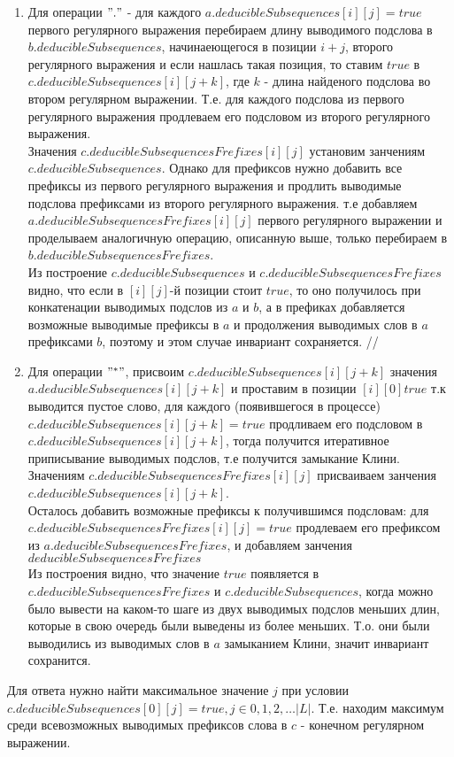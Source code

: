 \documentclass{article}
\begin{document}
\begin{flushleft}
\begin{enumerate}
			\item
				Для операции $"."$ - для каждого $a.deducibleSubsequences[i][j] = true$ первого регулярного выражения перебираем длину выводимого подслова в  $b.deducibleSubsequences$, начинаеющегося в позиции $i+j$, второго регулярного выражения и если нашлась такая позиция, то ставим $true$ в $c.deducibleSubsequences[i][j+k]$, где $k$ - длина найденого подслова во втором регулярном выражении. Т.е. для каждого подслова из первого регулярного выражения продлеваем его подсловом из второго регулярного выражения.\\
				Значения $c.deducibleSubsequencesFrefixes[i][j]$ установим занчениям $c.deducibleSubsequences$. Однако для префиксов нужно добавить все префиксы из первого регулярного выражения и продлить выводимые подслова префиксами из второго регулярного выражения. т.е добавляем
				$a.deducibleSubsequencesFrefixes[i][j]$ первого регулярного выражении и  проделываем аналогичную операцию, описанную выше,  только перебираем в  $b.deducibleSubsequencesFrefixes$.\\
				Из построение $c.deducibleSubsequences$ и $c.deducibleSubsequencesFrefixes$ видно, что если в $[i][j]$-й позиции стоит $true$, то оно получилось при конкатенации выводимых подслов из $a$ и $b$, а в префиках добавляется возможные выводимые префиксы в $a$ и продолжения выводимых слов в $a$ префиксами $b$, поэтому и этом случае инвариант сохраняется. //
				
			\item
				Для операции $"^*"$, присвоим $c.deducibleSubsequences[i][j+k]$ значения $a.deducibleSubsequences[i][j+k]$ и проставим в позиции $[i][0] true$ т.к выводится пустое слово, для каждого (появившегося в процессе) $c.deducibleSubsequences[i][j+k] = true$ продливаем его подсловом в $c.deducibleSubsequences[i][j+k]$, тогда получится итеративное приписывание выводимых подслов, т.е получится замыкание Клини.\\
				Значениям $c.deducibleSubsequencesFrefixes[i][j]$ присваиваем занчения $c.deducibleSubsequences[i][j+k]$.\\
				Осталось добавить возможные префиксы к получившимся подсловам: для $c.deducibleSubsequencesFrefixes[i][j] = true$ продлеваем его префиксом из $a.deducibleSubsequencesFrefixes$, и добавляем занчения $deducibleSubsequencesFrefixes$\\
				Из построения видно, что значение $true$ появляется в $c.deducibleSubsequencesFrefixes$ и $c.deducibleSubsequences$, когда можно было вывести на каком-то шаге из двух выводимых подслов меньших длин, которые в свою очередь были выведены из более меньших. Т.о. они были выводились из выводимых слов в $a$ замыканием Клини, значит инвариант сохранится.\\
			\end{enumerate} 
		Для ответа нужно найти максимальное значение $j$ при условии  $c.deducibleSubsequences[0][j] = true , j \in {0,1,2, \ldots |L|}$. Т.е. находим максимум среди  всевозможных выводимых префиксов слова в $c$ - конечном регулярном выражении.
	\end{flushleft}
\end{document}
